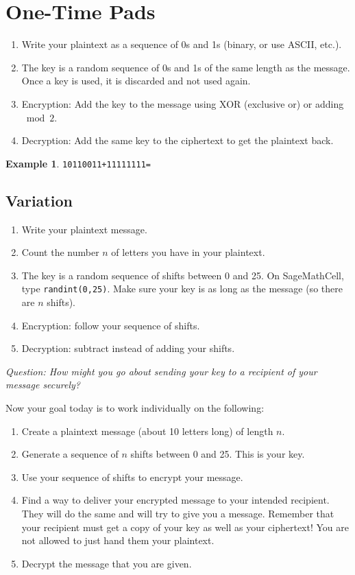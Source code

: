 \documentclass[12pt]{amsart}
\theoremstyle{plain}
\theoremstyle{definition}
\newtheorem*{ex}{Example}
\theoremstyle{remark}
\newcommand{\bex}{\begin{ex}}
\newcommand{\eex}{\end{ex}}
\begin{document}
\section{One-Time Pads}
\begin{enumerate}[1.]
	\item Write your plaintext as a sequence of 0s and 1s (binary, or use ASCII, etc.).
	\item The key is a random sequence of 0s and 1s of the same length as the message.  Once a key is used, it is discarded and not used again.
	\item Encryption: Add the key to the message using XOR (exclusive or) or adding $\bmod 2$.
	\item Decryption: Add the same key to the ciphertext to get the plaintext back.
\end{enumerate}

\bex
\texttt{10110011+11111111=}
\eex

\subsection*{Variation}
\begin{enumerate}[1.]
	\item Write your plaintext message.
	\item Count the number $n$ of letters you have in your plaintext.
	\item The key is a random sequence of shifts between 0 and 25.  On SageMathCell, type \texttt{randint(0,25)}.  Make sure your key is as long as the message (so there are $n$ shifts).
	\item Encryption: follow your sequence of shifts.
	\item Decryption: subtract instead of adding your shifts.
\end{enumerate}

\noindent \emph{Question: How might you go about sending your key to a recipient of your message securely?}\\ 
\vspace{1in}

\newpage Now your goal today is to work individually on the following:
\begin{enumerate}[1.]
	\item Create a plaintext message (about 10 letters long) of length $n$.
	\item Generate a sequence of $n$ shifts between 0 and 25.  This is your key.
	\item Use your sequence of shifts to encrypt your message.
	\item Find a way to deliver your encrypted message to your intended recipient.  They will do the same and will try to give you a message.  Remember that your recipient must get a copy of your key as well as your ciphertext!  You are not allowed to just hand them your plaintext.
	\item Decrypt the message that you are given.
\end{enumerate}
\end{document}

